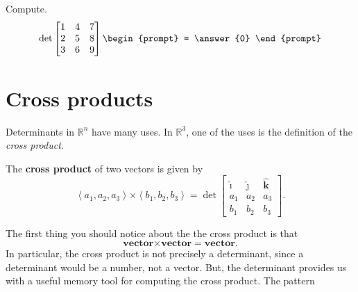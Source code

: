 \documentclass{ximera}
\begin{document}
\begin{question}
  Compute.
  \[
  \det
  \begin{bmatrix} 
    1 & 4 & 7\\
    2 & 5 & 8\\
    3 & 6 & 9\\
  \end{bmatrix}
  \begin{prompt}
    = \answer{0}
  \end{prompt}
  \]
\end{question}


\section{Cross products}

Determinants in $\mathbb{R}^n$ have many uses. In $\mathbb{R}^3$, one of the uses is
the definition of the \textit{cross product}.


\begin{definition}
  The \textbf{cross product} of two vectors is given by 
  \[
  \left< a_1,a_2,a_3 \right> \boldsymbol\times \left< b_1,b_2,b_3 \right> = \det
  \begin{bmatrix}
    \boldsymbol{\hat{\imath}} & \boldsymbol{\hat{\jmath}} & \boldsymbol{\hat{k}}\\
    a_1 & a_2 & a_3\\
    b_1 & b_2 & b_3
  \end{bmatrix}.
  \]
\end{definition}
The first thing you should notice about the the cross product is that
\[
\mathbf{vector} \boldsymbol\times \mathbf{vector} = \mathbf{vector}.
\]
In particular, the cross product is not precisely a determinant, since 
a determinant would be a number, not a vector.  But, the determinant 
provides us with a useful memory tool for computing the cross product.  The pattern
\end{document}
